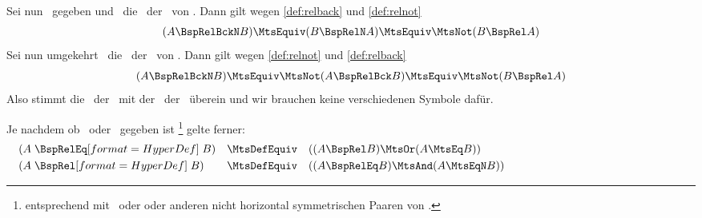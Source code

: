Sei nun \BspRel\ gegeben und  \BspRelBckN\ die \Umkehrrelation\ der \Negation\ von \BspRel.
Dann gilt wegen \vref{def:relback} und \vref{def:relnot}
\[(A \BspRelBckN B) \MtsEquiv (B \BspRelN A) \MtsEquiv \MtsNot (B \BspRel A)\]
Sei nun umgekehrt \BspRelBckN\ die \Negation\ der \Umkehrrelation\ von \BspRel.
Dann gilt wegen \vref{def:relnot} und \vref{def:relback}
\[(A \BspRelBckN B) \MtsEquiv \MtsNot (A \BspRelBck B) \MtsEquiv \MtsNot (B \BspRel A)\]
Also stimmt die \Umkehrrelation\ der \Negation\ mit der \Negation\ der \Umkehrrelation\ überein und wir brauchen keine verschiedenen Symbole dafür.

Je nachdem ob \BspRel\ oder \BspRelEq\ gegeben ist%
\footnote{%
	entsprechend mit \BspRelBck\ oder \BspRelBckEq oder anderen nicht horizontal symmetrischen Paaren von \Symbolen.
}
gelte ferner:
\begin{align}
	& (A \defSymBin{\BspRelEq}   B) & \MtsDefEquiv \quad & ((A \BspRel   B) \MtsOr  (A \MtsEq B))
	\label{def:releq} \\
	& (A \defSymBin{\BspRel}     B) & \MtsDefEquiv \quad & ((A \BspRelEq B) \MtsAnd (A \MtsEqN B))
	\label{def:relbsp}   \formulatoleft\formulatoleft\formulatoleft
\end{align}

